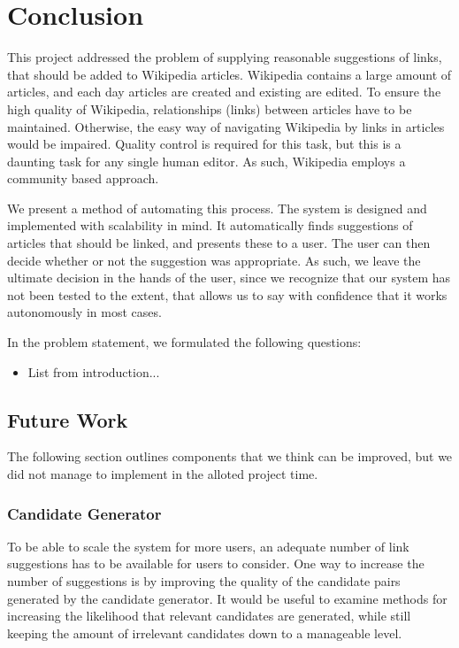 \chapter{Conclusion}\label{chap:conclusion}
This project addressed the problem of supplying reasonable suggestions of links, that should be added to Wikipedia articles. Wikipedia contains a large amount of articles, and each day articles are created and existing are edited. To ensure the high quality of Wikipedia, relationships (links) between articles have to be maintained. Otherwise, the easy way of navigating Wikipedia by links in articles would be impaired. Quality control is required for this task, but this is a daunting task for any single human editor. As such, Wikipedia employs a community based approach. 

We present a method of automating this process. The system is designed and implemented with scalability in mind. It automatically finds suggestions of articles that should be linked, and presents these to a user. The user can then decide whether or not the suggestion was appropriate. As such, we leave the ultimate decision in the hands of the user, since we recognize that our system has not been tested to the extent, that allows us to say with confidence that it works autonomously in most cases.

In the problem statement, we formulated the following questions:
\begin{itemize}
	\item List from introduction...
\end{itemize}


\section{Future Work}
The following section outlines components that we think can be improved, but we did not manage to implement in the alloted project time.

\subsection{Candidate Generator}
To be able to scale the system for more users, an adequate number of link suggestions has to be available for users to consider. One way to increase the number of suggestions is by improving the quality of the candidate pairs generated by the candidate generator. It would be useful to examine methods for increasing the likelihood that relevant candidates are generated, while still keeping the amount of irrelevant candidates down to a manageable level.

